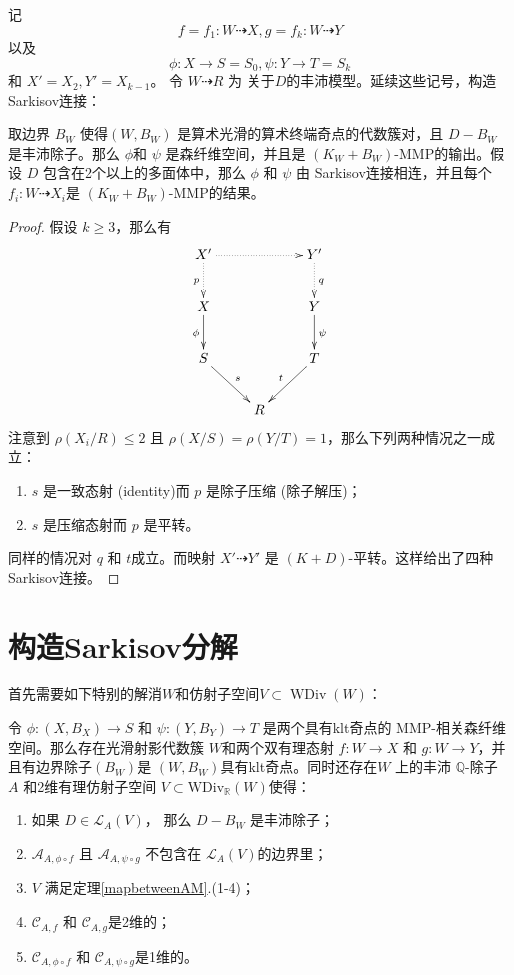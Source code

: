 记 
\[ f=f_1:W\dashrightarrow X, g=f_k:W\dashrightarrow Y \]
以及 
\[ \phi:X\to S=S_0,\psi:Y\to T=S_k \]
和 $ X'=X_2,Y'=X_{k-1}$。 令 $ W\dashrightarrow R $ 为 关于$ D $的丰沛模型。延续这些记号，构造Sarkisov连接：
\begin{theorem}\label{constructlink}
  \cite[Theorem 3.7]{haconSarkisovProgram2012} 取边界 $ B_W $ 使得$ (W,B_W) $ 是算术光滑的算术终端奇点的代数簇对，且 $ D-B_W $ 是丰沛除子。那么 $ \phi $和 $ \psi $ 是森纤维空间，并且是 $ (K_W+B_W) $-MMP的输出。假设 $ D $ 包含在2个以上的多面体中，那么 $\phi$ 和 $\psi$ 由 Sarkisov连接相连，并且每个 $f_{i}:W \dashrightarrow  X_{i}$是  $(K_{W}+B_{W})$-MMP的结果。
\end{theorem}
\begin{proof}
  假设 $ k\geqslant 3 $，那么有
  \[ \xymatrix{
      X'\ar@{.>}[d]_p\ar@{.>}[rr]&&Y'\ar@{.>}[d]^q\\
      X\ar[d]_{\phi}&&Y\ar[d]^\psi\\
      S\ar[rd]^s&&T\ar[ld]_t\\
      &R&} \]
  注意到 $ \rho(X_i/R)\leqslant 2 $ 且 $ \rho(X/S)=\rho(Y/T)=1 $，那么下列两种情况之一成立：
  \begin{enumerate}
    \item $ s $ 是一致态射 (identity)而 $ p $ 是除子压缩 (除子解压)；
    \item $ s $ 是压缩态射而 $ p $ 是平转。
  \end{enumerate}
  同样的情况对 $ q $ 和 $ t $成立。而映射 $X'\dashrightarrow Y'$ 是 $(K+D)$-平转。这样给出了四种Sarkisov连接。
\end{proof}

\section{构造Sarkisov分解}
首先需要如下特别的解消$W$和仿射子空间$V \subset \operatorname{WDiv}(W)$：

\begin{lemma}\label{keylemma}
  \cite[Lemma 4.1]{haconSarkisovProgram2012} 令 $ \phi: (X,B_{X}) \to S $ 和 $ \psi: (Y,B_{Y})\to T  $ 是两个具有klt奇点的 MMP-相关森纤维空间。那么存在光滑射影代数簇 $ W $和两个双有理态射 $ f:W\to X $  和 $ g:W\to Y $，并且有边界除子$(B_{W})$是 $ (W,B_{W}) $具有klt奇点。同时还存在$W$ 上的丰沛 $ \mathbb{Q} $-除子 $ A $ 和2维有理仿射子空间 $ V \subset \mathrm{WDiv}_{\mathbb{R}}(W) $使得：
  \begin{enumerate}
    \item 如果 $ D\in \mathcal{L}_A(V) $， 那么 $ D-B_W $ 是丰沛除子；
    \item $ \mathcal{A}_{A,\phi\circ f} $ 且 $ \mathcal{A}_{A,\psi\circ g} $ 不包含在 $ \mathcal{L}_A(V) $的边界里；
    \item $ V $ 满足定理\ref{mapbetweenAM}.(1-4)；
    \item $ \mathcal{C}_{A,f} $ 和 $ \mathcal{C}_{A,g} $是2维的； 
    \item $ \mathcal{C}_{A,\phi\circ f} $ 和 $ \mathcal{C}_{A,\psi\circ g} $是1维的。 
  \end{enumerate}
\end{lemma}

